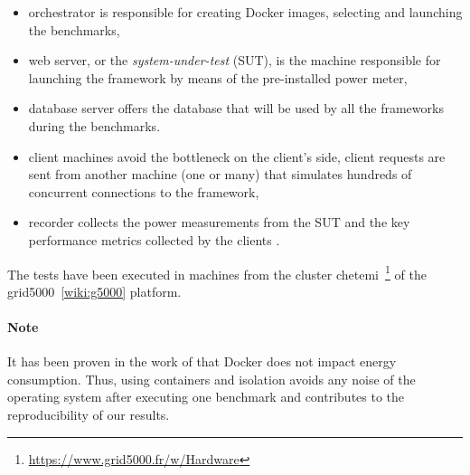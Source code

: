 

\begin{itemize}
    \item \textsf{orchestrator} is responsible for creating Docker images, selecting and launching the benchmarks,
    \item \textsf{web server}, or the \emph{system-under-test} (SUT), is the machine responsible for launching the framework by means of the pre-installed power meter,
    \item \textsf{database server} offers the database that will be used by all the frameworks during the benchmarks.
    \item \textsf{client machines} avoid the bottleneck on the client's side, client requests are sent from another machine (one or many) that simulates hundreds of concurrent connections to the framework,
    \item \textsf{recorder} collects the power measurements from the SUT and the key performance metrics collected by the clients .
\end{itemize}

The tests have been executed in machines from the cluster \textsf{chetemi}~\footnote{\url{https://www.grid5000.fr/w/Hardware}} of the grid5000~\ref{wiki:g5000} platform.


\paragraph{Note}
It has been proven in the work of \citeauthor{eddie_antonio_santos_how} that Docker does not impact energy consumption.
Thus, using containers and isolation avoids any noise of the operating system after executing one benchmark and contributes to the reproducibility of our results.

